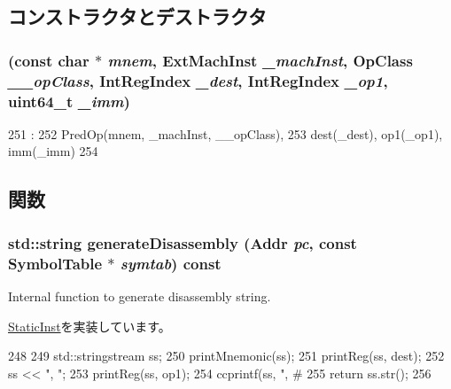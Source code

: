 \subsection{コンストラクタとデストラクタ}
\hypertarget{classRegRegImmOp_a877a7ce0fe90e8d68be64602fde5b8b6}{
\subsubsection[{RegRegImmOp}]{ (const char $\ast$ {\em mnem}, \/  {\bf ExtMachInst} {\em \_\-machInst}, \/  OpClass {\em \_\-\_\-opClass}, \/  {\bf IntRegIndex} {\em \_\-dest}, \/  {\bf IntRegIndex} {\em \_\-op1}, \/  uint64\_\-t {\em \_\-imm})}}
\label{classRegRegImmOp_a877a7ce0fe90e8d68be64602fde5b8b6}



\begin{DoxyCode}
251                                :
252         PredOp(mnem, _machInst, __opClass),
253         dest(_dest), op1(_op1), imm(_imm)
254     {}

\end{DoxyCode}


\subsection{関数}
\hypertarget{classRegRegImmOp_a95d323a22a5f07e14d6b4c9385a91896}{
\subsubsection[{generateDisassembly}]{\setlength{\rightskip}{0pt plus 5cm}std::string generateDisassembly ({\bf Addr} {\em pc}, \/  const SymbolTable $\ast$ {\em symtab}) const}}
\label{classRegRegImmOp_a95d323a22a5f07e14d6b4c9385a91896}
Internal function to generate disassembly string. 

\hyperlink{classStaticInst_ab4a569d2623620c04f8a52bbd91d63b9}{StaticInst}を実装しています。


\begin{DoxyCode}
248 {
249     std::stringstream ss;
250     printMnemonic(ss);
251     printReg(ss, dest);
252     ss << ", ";
253     printReg(ss, op1);
254     ccprintf(ss, ", #%
255     return ss.str();
256 }
\end{DoxyCode}


